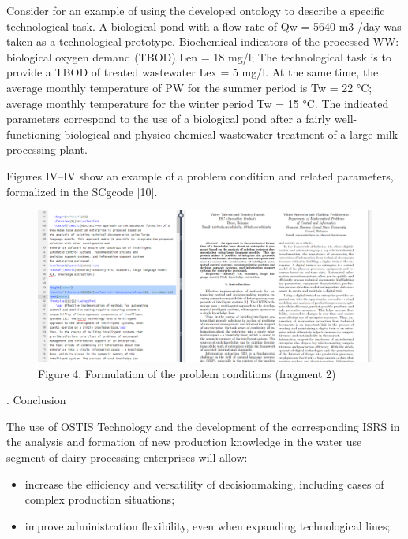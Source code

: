 \documentclass[10pt,final]{article}
\newcommand{\RomanNumeralCaps}[1]
    {\MakeUppercase{\romannumeral #1}}
\begin{document}
\begin{multicols}{2}
Consider for an example of using the developed ontology to describe a specific technological task. A biological
pond with a flow rate of Qw = 5640 m3
/day was taken as
a technological prototype. Biochemical indicators of the
processed WW: biological oxygen demand (TBOD) Len
= 18 mg/l; The technological task is to provide a TBOD
of treated wastewater Lex = 5 mg/l. At the same time,
the average monthly temperature of PW for the summer
period is Tw = 22 °C; average monthly temperature for
the winter period Tw = 15 °C. The indicated parameters
correspond to the use of a biological pond after a
fairly well-functioning biological and physico-chemical
wastewater treatment of a large milk processing plant.

Figures IV–IV show an example of a problem condition and related parameters, formalized in the SCgcode [10].

\begin{figure}[H]
    \centering
    \includegraphics[width=1\linewidth]{image.png}
    {\scriptsize Figure 4. Formulation of the problem conditions (fragment 2)}
    \label{fig:enter-label}
\end{figure}

\begin{center}
    \RomanNumeralCaps{5}. Conclusion
\end{center} 

The use of OSTIS Technology and the development of
the corresponding ISRS in the analysis and formation of
new production knowledge in the water use segment of
dairy processing enterprises will allow:

\begin{itemize}[leftmargin=7mm]
\item  increase the efficiency and versatility of decisionmaking, including cases of complex production situations;

\item  improve administration flexibility, even when expanding technological lines;


\end{itemize}
\end{multicols}
\end{document}
